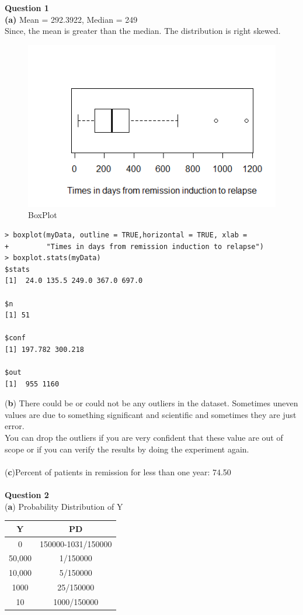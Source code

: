 \documentclass[12pt,letterpaper]{article}
\begin{document}
{\Large {\textbf{Question 1}}}\\

\textbf{(a)}
Mean = 292.3922,
    		  Median = 249\\
              Since, the mean is greater than the median. The distribution is right skewed.\\
   \begin{figure}[!h]
   \centering
    \includegraphics[width=0.5\linewidth]{Rplot.png}
    \caption{BoxPlot}
    \end{figure}
     \begin{lstlisting}[label=R Code,caption=Q1(a) R Code Output]
> boxplot(myData, outline = TRUE,horizontal = TRUE, xlab =
+         "Times in days from remission induction to relapse")
> boxplot.stats(myData)
$stats
[1]  24.0 135.5 249.0 367.0 697.0

$n
[1] 51

$conf
[1] 197.782 300.218

$out
[1]  955 1160
\end{lstlisting}
 
 {(\textbf{b})} There could be or could not be any outliers in the dataset. Sometimes uneven values are due to something significant and scientific and sometimes they are just error.\\ 
 You can drop the outliers if you are very confident that these value are out of scope or if you can verify the results by doing the experiment again.\\
\\ 
{(\textbf{c})}Percent of  patients  in remission for less than one year:  74.50\\
\\
{\Large {\textbf{Question 2}}}\\

{(\textbf{a})} Probability Distribution of Y
\begin{center}
 \begin{tabular}{||c | c ||} 
 \hline
 Y & PD \\ [0.5ex] 
 \hline
 0 & 150000-1031/150000 \\ 
 \hline
 50,000 & 1/150000 \\ 
 \hline
 10,000 & 5/150000 \\
 \hline
 1000 & 25/150000 \\
 \hline
 10 & 1000/150000 \\[1ex] 
 
 \hline
\end{tabular}
\end{center}
\end{document}
